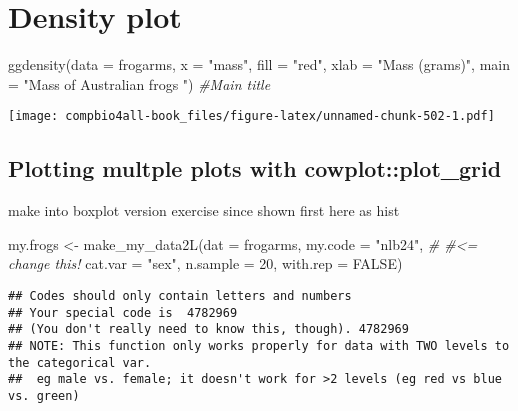 \documentclass[
]{book}
\newenvironment{Shaded}{\begin{snugshade}}{\end{snugshade}}
\newcommand{\AttributeTok}[1]{\textcolor[rgb]{0.77,0.63,0.00}{#1}}
\newcommand{\CommentTok}[1]{\textcolor[rgb]{0.56,0.35,0.01}{\textit{#1}}}
\newcommand{\ConstantTok}[1]{\textcolor[rgb]{0.00,0.00,0.00}{#1}}
\newcommand{\DecValTok}[1]{\textcolor[rgb]{0.00,0.00,0.81}{#1}}
\newcommand{\FunctionTok}[1]{\textcolor[rgb]{0.00,0.00,0.00}{#1}}
\newcommand{\NormalTok}[1]{#1}
\newcommand{\OtherTok}[1]{\textcolor[rgb]{0.56,0.35,0.01}{#1}}
\newcommand{\StringTok}[1]{\textcolor[rgb]{0.31,0.60,0.02}{#1}}
\begin{document}
\hypertarget{density-plot-2}{%
\section{Density plot}\label{density-plot-2}}

\begin{Shaded}
\begin{Highlighting}[]
\FunctionTok{ggdensity}\NormalTok{(}\AttributeTok{data =}\NormalTok{ frogarms,}
            \AttributeTok{x =} \StringTok{"mass"}\NormalTok{,}
            \AttributeTok{fill =} \StringTok{"red"}\NormalTok{,}
            \AttributeTok{xlab =} \StringTok{"Mass (grams)"}\NormalTok{,}
          \AttributeTok{main =} \StringTok{"Mass of Australian frogs "}\NormalTok{) }\CommentTok{\#Main title}
\end{Highlighting}
\end{Shaded}

\texttt{[image: compbio4all-book\_files/figure-latex/unnamed-chunk-502-1.pdf]}

\hypertarget{plotting-multple-plots-with-cowplotplot_grid-2}{%
\subsection{Plotting multple plots with cowplot::plot\_grid}\label{plotting-multple-plots-with-cowplotplot_grid-2}}

make into boxplot version exercise since shown first here as hist

\begin{Shaded}
\begin{Highlighting}[]
\NormalTok{my.frogs }\OtherTok{\textless{}{-}} \FunctionTok{make\_my\_data2L}\NormalTok{(}\AttributeTok{dat =}\NormalTok{ frogarms, }
                           \AttributeTok{my.code =} \StringTok{"nlb24"}\NormalTok{, }\CommentTok{\# \#\textless{}=  change this!}
                           \AttributeTok{cat.var =} \StringTok{"sex"}\NormalTok{,}
                           \AttributeTok{n.sample =} \DecValTok{20}\NormalTok{, }
                           \AttributeTok{with.rep =} \ConstantTok{FALSE}\NormalTok{)}
\end{Highlighting}
\end{Shaded}

\begin{verbatim}
## Codes should only contain letters and numbers
## Your special code is  4782969
## (You don't really need to know this, though). 4782969
## NOTE: This function only works properly for data with TWO levels to the categorical var.
##  eg male vs. female; it doesn't work for >2 levels (eg red vs blue vs. green)
\end{verbatim}
\end{document}
